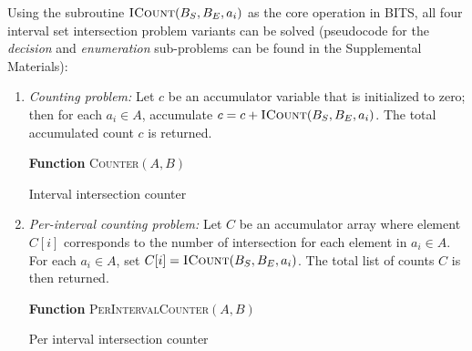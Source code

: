\documentclass{bioinfo}
\begin{document}

Using the subroutine $\textsc{ICount}(B_S,B_E,a_i)$ as the core operation in
BITS, all four interval set intersection problem variants can be solved
(pseudocode for the \emph{decision} and \emph{enumeration} sub-problems can be
found in the Supplemental Materials):

\begin{enumerate}


	\item {\em Counting problem:}
	Let $c$ be an accumulator variable that is initialized to zero; then for
	each $a_i \in A$, accumulate $c = c + \textsc{ICount}(B_S,B_E,a_i)$.  The
	total accumulated count $c$ is returned.
	\begin{algorithm}[h]
		\DontPrintSemicolon
		\footnotesize
		\BlankLine
		\textbf{Function} \textsc{Counter}$(A,B)$
		\caption{Interval intersection counter}
	\end{algorithm}
	
	\item {\em Per-interval counting problem:}
	Let $C$ be an accumulator array where element $C[i]$ corresponds to the
	number of intersection for each element in $a_i\in A$.  For each 
	$a_i \in A$, set $C[i]=\textsc{ICount}(B_S,B_E,a_i)$.  The total list of
	counts $C$ is then returned.
	\begin{algorithm}[h]
		\DontPrintSemicolon
		\footnotesize
		\BlankLine
		\textbf{Function} \textsc{PerIntervalCounter}$(A,B)$
		\caption{Per interval intersection counter}
	\end{algorithm}


\end{enumerate}
\end{document}
